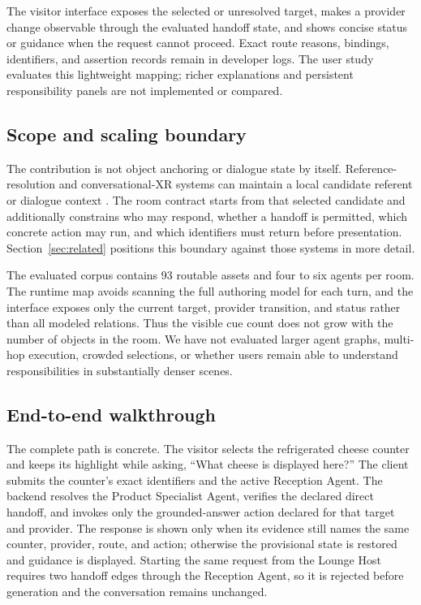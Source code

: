 The visitor interface exposes the selected or unresolved target, makes a
provider change observable through the evaluated handoff state, and shows
concise status or guidance when the request cannot proceed.  Exact route
reasons, bindings, identifiers, and assertion records remain in developer logs.
The user study evaluates this lightweight mapping; richer explanations and
persistent responsibility panels are not implemented or compared.

\subsection{Scope and scaling boundary}

The contribution is not object anchoring or dialogue state by itself.
Reference-resolution and conversational-XR systems can maintain a local
candidate referent or dialogue context
\cite{lemaignan2012grounding,delatorre2024llmr,carcangiu2025tellxr}.  The room
contract starts from that selected candidate and additionally constrains who
may respond, whether a handoff is permitted, which concrete action may run, and
which identifiers must return before presentation.  Section~\ref{sec:related}
positions this boundary against those systems in more detail.

The evaluated corpus contains 93 routable assets and four to six agents per
room.  The runtime map avoids scanning the full authoring model for each turn,
and the interface exposes only the current target, provider transition, and
status rather than all modeled relations.  Thus the visible cue count does not
grow with the number of objects in the room.  We have not evaluated larger
agent graphs, multi-hop execution, crowded selections, or whether users remain
able to understand responsibilities in substantially denser scenes.

\subsection{End-to-end walkthrough}

The complete path is concrete.  The visitor selects the refrigerated cheese
counter and keeps its highlight while asking, ``What cheese is displayed
here?''  The client submits the counter's exact identifiers and the active
Reception Agent.  The backend resolves the Product Specialist Agent, verifies
the declared direct handoff, and invokes only the grounded-answer action
declared for that target and provider.  The response is shown only when its
evidence still names the same counter, provider, route, and action; otherwise
the provisional state is restored and guidance is displayed.  Starting the
same request from the Lounge Host requires two handoff edges through the
Reception Agent, so it is rejected before generation and the conversation
remains unchanged.

